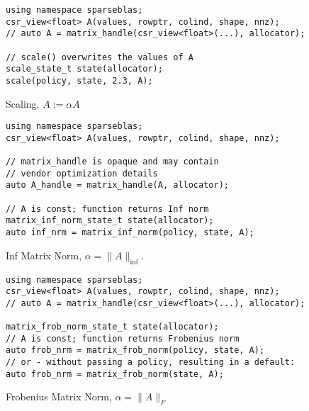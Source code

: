 \documentclass{article}
\begin{document}

\begin{listing}[H]
\begin{verbatim}
using namespace sparseblas;
csr_view<float> A(values, rowptr, colind, shape, nnz);
// auto A = matrix_handle(csr_view<float>(...), allocator);

// scale() overwrites the values of A 
scale_state_t state(allocator);
scale(policy, state, 2.3, A);
\end{verbatim}
\caption{Scaling, $A := \alpha A$}
\end{listing}



\begin{listing}[H]
\begin{verbatim}
using namespace sparseblas;
csr_view<float> A(values, rowptr, colind, shape, nnz);

// matrix_handle is opaque and may contain 
// vendor optimization details
auto A_handle = matrix_handle(A, allocator);

// A is const; function returns Inf norm
matrix_inf_norm_state_t state(allocator);
auto inf_nrm = matrix_inf_norm(policy, state, A);
\end{verbatim}
\caption{Inf Matrix Norm, $\alpha = \|A\|_\text{inf}$.}
\end{listing}



\begin{listing}[H]
\begin{verbatim}
using namespace sparseblas;
csr_view<float> A(values, rowptr, colind, shape, nnz);
// auto A = matrix_handle(csr_view<float>(...), allocator);

matrix_frob_norm_state_t state(allocator);
// A is const; function returns Frobenius norm
auto frob_nrm = matrix_frob_norm(policy, state, A);
// or - without passing a policy, resulting in a default:
auto frob_nrm = matrix_frob_norm(state, A);
\end{verbatim}
\caption{Frobenius Matrix Norm, $\alpha = \|A\|_F$}
\end{listing}
\end{document}
